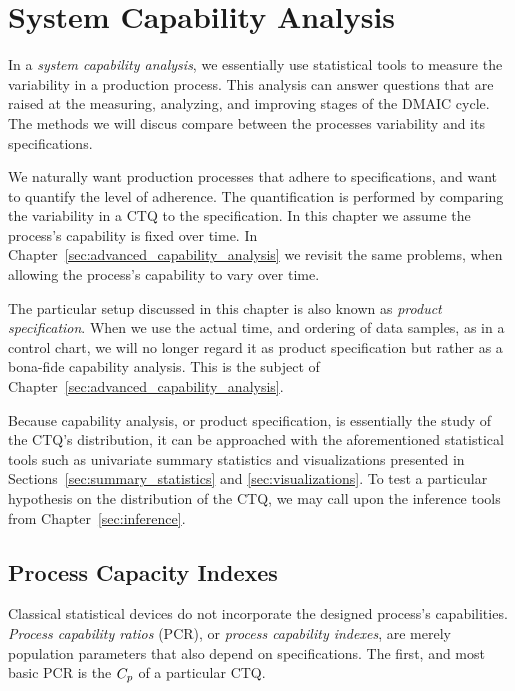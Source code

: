 \chapter{System Capability Analysis}
\label{sec:capability_analysis}

In a \emph{system capability analysis}, we essentially use statistical tools to measure the variability in a production process.
This analysis can answer questions that are raised at the measuring, analyzing, and improving stages of the DMAIC cycle. 
The methods we will discus compare between the processes variability and its specifications. 

We naturally want production processes that adhere to specifications, and want to quantify the level of adherence.
The quantification is performed by comparing the variability in a CTQ to the specification.
In this chapter we assume the process’s capability is fixed over time. 
In Chapter~\ref{sec:advanced_capability_analysis} we revisit the same problems, when allowing the process’s capability to vary over time. 

The particular setup discussed in this chapter is also known as \emph{product specification}.
When we use the actual time, and ordering of data samples, as in a control chart, we will no longer regard it as product specification but rather as a bona-fide capability analysis. This is the subject of Chapter~\ref{sec:advanced_capability_analysis}.



 
 
 
Because capability analysis, or product specification, is essentially the study of the CTQ's distribution, it can be approached with the aforementioned statistical tools such as univariate summary statistics and visualizations presented in Sections~\ref{sec:summary_statistics} and \ref{sec:visualizations}.
To test a particular hypothesis on the distribution of the CTQ, we may call upon the inference tools from Chapter~\ref{sec:inference}.




\section{Process Capacity Indexes}

Classical statistical devices do not incorporate the designed process's capabilities.
\emph{Process capability ratios} (PCR), or \emph{process capability indexes}, are merely population parameters that also depend on specifications.
The first, and most basic PCR is the $C_p$ of a particular CTQ.

